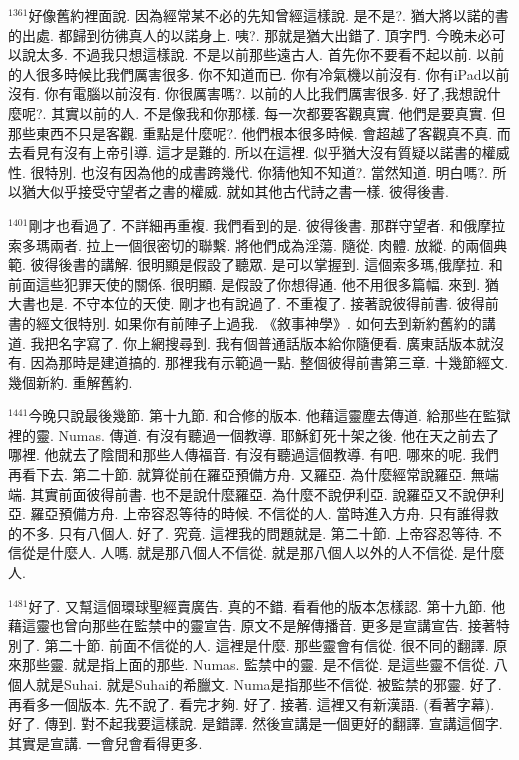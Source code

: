 \documentclass{book}
\begin{document}
$^{1361}$好像舊約裡面說.
因為經常某不必的先知曾經這樣說.
是不是?.
猶大將以諾的書的出處.
都歸到彷彿真人的以諾身上.
咦?.
那就是猶大出錯了.
頂字門.
今晚未必可以說太多.
不過我只想這樣說.
不是以前那些遠古人.
首先你不要看不起以前.
以前的人很多時候比我們厲害很多.
你不知道而已.
你有冷氣機以前沒有.
你有iPad以前沒有.
你有電腦以前沒有.
你很厲害嗎?.
以前的人比我們厲害很多.
好了,我想說什麼呢?.
其實以前的人.
不是像我和你那樣.
每一次都要客觀真實.
他們是要真實.
但那些東西不只是客觀.
重點是什麼呢?.
他們根本很多時候.
會超越了客觀真不真.
而去看見有沒有上帝引導.
這才是難的.
所以在這裡.
似乎猶大沒有質疑以諾書的權威性.
很特別.
也沒有因為他的成書跨幾代.
你猜他知不知道?.
當然知道.
明白嗎?.
所以猶大似乎接受守望者之書的權威.
就如其他古代詩之書一樣.
彼得後書.

$^{1401}$剛才也看過了.
不詳細再重複.
我們看到的是.
彼得後書.
那群守望者.
和俄摩拉索多瑪兩者.
拉上一個很密切的聯繫.
將他們成為淫蕩.
隨從.
肉體.
放縱.
的兩個典範.
彼得後書的講解.
很明顯是假設了聽眾.
是可以掌握到.
這個索多瑪,俄摩拉.
和前面這些犯罪天使的關係.
很明顯.
是假設了你想得通.
他不用很多篇幅.
來到.
猶大書也是.
不守本位的天使.
剛才也有說過了.
不重複了.
接著說彼得前書.
彼得前書的經文很特別.
如果你有前陣子上過我.
《敘事神學》.
如何去到新約舊約的講道.
我把名字寫了.
你上網搜尋到.
我有個普通話版本給你隨便看.
廣東話版本就沒有.
因為那時是建道搞的.
那裡我有示範過一點.
整個彼得前書第三章.
十幾節經文.
幾個新約.
重解舊約.

$^{1441}$今晚只說最後幾節.
第十九節.
和合修的版本.
他藉這靈塵去傳道.
給那些在監獄裡的靈.
Numas.
傳道.
有沒有聽過一個教導.
耶穌釘死十架之後.
他在天之前去了哪裡.
他就去了陰間和那些人傳福音.
有沒有聽過這個教導.
有吧.
哪來的呢.
我們再看下去.
第二十節.
就算從前在羅亞預備方舟.
又羅亞.
為什麼經常說羅亞.
無端端.
其實前面彼得前書.
也不是說什麼羅亞.
為什麼不說伊利亞.
說羅亞又不說伊利亞.
羅亞預備方舟.
上帝容忍等待的時候.
不信從的人.
當時進入方舟.
只有誰得救的不多.
只有八個人.
好了.
究竟.
這裡我的問題就是.
第二十節.
上帝容忍等待.
不信從是什麼人.
人嗎.
就是那八個人不信從.
就是那八個人以外的人不信從.
是什麼人.

$^{1481}$好了.
又幫這個環球聖經賣廣告.
真的不錯.
看看他的版本怎樣認.
第十九節.
他藉這靈也曾向那些在監禁中的靈宣告.
原文不是解傳播音.
更多是宣講宣告.
接著特別了.
第二十節.
前面不信從的人.
這裡是什麼.
那些靈會有信從.
很不同的翻譯.
原來那些靈.
就是指上面的那些.
Numas.
監禁中的靈.
是不信從.
是這些靈不信從.
八個人就是Suhai.
就是Suhai的希臘文.
Numa是指那些不信從.
被監禁的邪靈.
好了.
再看多一個版本.
先不說了.
看完才夠.
好了.
接著.
這裡又有新漢語.
(看著字幕).
好了.
傳到.
對不起我要這樣說.
是錯譯.
然後宣講是一個更好的翻譯.
宣講這個字.
其實是宣講.
一會兒會看得更多.
\end{document}
